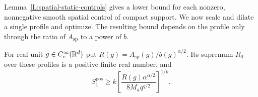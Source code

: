 Lemma~\ref{L:spatial-static-controls} gives a lower bound for each nonzero,
nonnegative smooth spatial control of compact support. We now scale and
dilate a single profile and optimize. The resulting bound depends on the
profile only through the ratio of $A_{\mathrm{sp}}$ to a power of $b$.

\begin{proposition}
  \label{P:spatial-smooth-ratio}
  For real unit $g \in C_c^\infty(\mathbb{R}^d)$ put $R(g) =
  A_{\mathrm{sp}}(g)/b(g)^{\alpha/2}$. Its supremum $R_0$ over these profiles is
  a positive finite real number, and
  \begin{equation}\label{E:spatial-smooth-score}
    S_1^{\mathrm{pos}}\ge
    k\left[
    \frac{R(g)\alpha^{\alpha/2}}{8M_aq^{q/2}}
    \right]^{1/k}.
  \end{equation}
\end{proposition}

